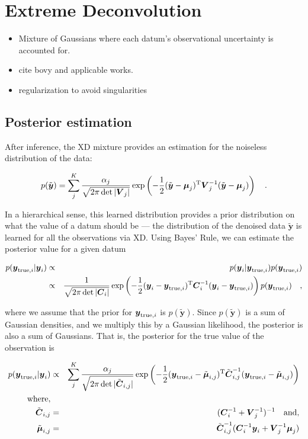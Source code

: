 \documentclass[12pt,preprint]{aastex}
\newcommand{\datavector}[1]{\boldsymbol{#1}}
\newcommand{\data}{\datavector{y}}
\newcommand{\datum}{\data_i}
\newcommand{\truedatum}{\data_{{\rm true}, i}}
\newcommand{\noiselessdata}{\tilde{\data}}
\newcommand{\xdcov}{\datavector{V}_j}
\newcommand{\datacov}{\datavector{C}}
\newcommand{\postcov}{\tilde{\datacov}_{i, j}}
\newcommand{\vmu}{\datavector{\mu}}
\newcommand{\postmu}{\tilde{\vmu}_{i, j}}
\newcommand{\datumcov}{\datacov_i}
\newcommand{\transpose}{{\rm T}}
\begin{document}
%
%
\section{Extreme Deconvolution}

\begin{itemize}
\item Mixture of Gaussians where each datum's observational uncertainty is accounted for.
\item cite bovy and applicable works.
\item regularization to avoid singularities
\end{itemize}

\subsection{Posterior estimation}

After inference, the XD mixture provides an estimation for the noiseless distribution of 
the data:

\begin{eqnarray}\displaystyle
p(\noiselessdata) = \sum_j^K \frac{\alpha_j}{\sqrt{2\pi\det{|\xdcov|}}} \exp \left (-\frac{1}{2}(\noiselessdata - \vmu_j)^\transpose \xdcov^{-1}(\noiselessdata - \vmu_j) \right )
\quad .
\label{eqn:noiseless}
\end{eqnarray}

In a hierarchical sense, this learned distribution provides a prior distribution on what the 
value of a datum should be --- the distribution of the denoised data $\noiselessdata$ is 
learned for all the observations via XD.  Using Bayes' Rule, we can estimate the posterior 
value for a given datum

\begin{eqnarray}\displaystyle
p(\truedatum | \datum) & \propto & p(\datum | \truedatum) p(\truedatum) \\
                                         & \propto & \frac{1}{\sqrt{2\pi\det{|\datumcov|}}} \exp \left (-\frac{1}{2}(\datum - \truedatum)^\transpose \datumcov^{-1}(\datum - \truedatum) \right ) p(\truedatum)
\quad ,
\label{eqn:posterior}
\end{eqnarray}

\noindent where we assume that the prior for $\truedatum$ is $p(\noiselessdata)$.  Since 
$p(\noiselessdata)$ is a sum of Gaussian densities, and we multiply this by a Gaussian 
likelihood, the posterior is also a sum of Gaussians.  That is, the posterior for the true 
value of the observation is

\begin{eqnarray}\displaystyle
p(\truedatum | \datum) & \propto & \sum_j^K \frac{\alpha_j}{\sqrt{2\pi\det{|\postcov|}}} \exp \left (-\frac{1}{2}(\truedatum - \postmu)^\transpose \postcov^{-1}(\truedatum - \postmu) \right ) \\
{\rm where,}\\
\postcov & = & (\datumcov^{-1} + \xdcov^{-1})^{-1} \quad {\rm and,} \\
\postmu & = &  \postcov^{-1} (\datumcov^{-1} \datum + \xdcov^{-1} \vmu_j)
\label{eqn:posterior}
\end{eqnarray}
\end{document}
